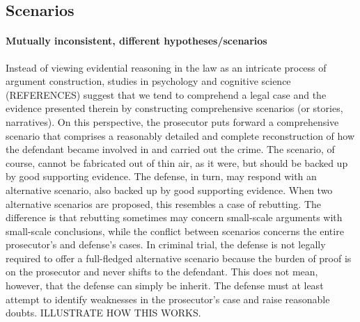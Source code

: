 \documentclass[10pt]{article}
\begin{document}
\subsection{Scenarios}

\paragraph{Mutually inconsistent, different hypotheses/scenarios}

Instead of viewing evidential reasoning in the law as an intricate process of argument construction, 
studies in psychology and cognitive 
science (REFERENCES) suggest that we tend to comprehend a legal case and the evidence presented therein 
by constructing comprehensive scenarios (or stories, narratives). On this perspective, the prosecutor puts forward 
a comprehensive scenario that comprises a reasonably detailed and complete 
reconstruction of how the defendant became involved in and carried out the crime. The scenario, of course, 
cannot be fabricated out of thin air, as it were, but should be backed up by good supporting evidence. 
The defense, in turn, may respond with an alternative scenario, also backed up by good supporting evidence. 
When two alternative scenarios are proposed, this resembles a case of rebutting. The difference is that rebutting sometimes may concern 
small-scale arguments with small-scale conclusions, while the conflict between scenarios 
concerns the entire prosecutor's and defense's cases. 
In criminal trial, the defense is not legally required to offer a full-fledged alternative scenario because 
the burden of proof is on the prosecutor and never shifts to the defendant. This does not mean, however, 
that the defense can simply be inherit. 
The defense must at least attempt to identify weaknesses in the prosecutor's case 
and raise reasonable doubts. ILLUSTRATE HOW THIS WORKS. 
\end{document}
